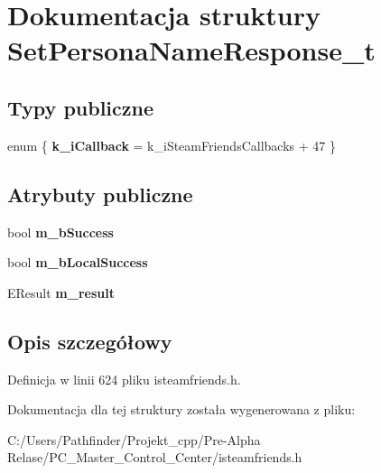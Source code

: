 \hypertarget{struct_set_persona_name_response__t}{}\section{Dokumentacja struktury Set\+Persona\+Name\+Response\+\_\+t}
\label{struct_set_persona_name_response__t}
\subsection*{Typy publiczne}
\begin{DoxyCompactItemize}
\item 
\mbox{\label{struct_set_persona_name_response__t_a9f645f2a12d6f74bd725e1129720ef77}} 
enum \{ {\bfseries k\+\_\+i\+Callback} = k\+\_\+i\+Steam\+Friends\+Callbacks + 47
 \}
\end{DoxyCompactItemize}
\subsection*{Atrybuty publiczne}
\begin{DoxyCompactItemize}
\item 
\mbox{\label{struct_set_persona_name_response__t_a6ddad6becef13bb26f86bb30a68336d3}} 
bool {\bfseries m\+\_\+b\+Success}
\item 
\mbox{\label{struct_set_persona_name_response__t_a36ac5899a48214b56d114999ca8bf9b9}} 
bool {\bfseries m\+\_\+b\+Local\+Success}
\item 
\mbox{\label{struct_set_persona_name_response__t_a388b9cff658ab622dc69378b59bc118e}} 
E\+Result {\bfseries m\+\_\+result}
\end{DoxyCompactItemize}


\subsection{Opis szczegółowy}


Definicja w linii 624 pliku isteamfriends.\+h.



Dokumentacja dla tej struktury została wygenerowana z pliku\+:\begin{DoxyCompactItemize}
\item 
C\+:/\+Users/\+Pathfinder/\+Projekt\+\_\+cpp/\+Pre-\/\+Alpha Relase/\+P\+C\+\_\+\+Master\+\_\+\+Control\+\_\+\+Center/isteamfriends.\+h\end{DoxyCompactItemize}
